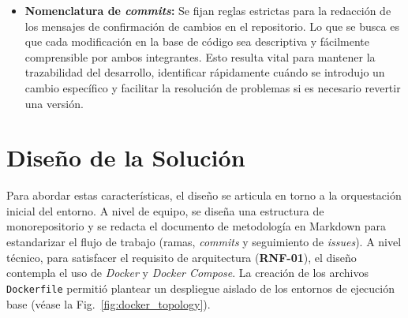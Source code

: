 \begin{itemize}
\begin{itemize}
        \item \textbf{Nomenclatura de \textit{commits}:} Se fijan reglas estrictas para la redacción de los mensajes de confirmación de cambios en el repositorio. Lo que se busca es que cada modificación en la base de código sea descriptiva y fácilmente comprensible por ambos integrantes. Esto resulta vital para mantener la trazabilidad del desarrollo, identificar rápidamente cuándo se introdujo un cambio específico y facilitar la resolución de problemas si es necesario revertir una versión.
    \end{itemize}
\end{itemize}

\section{Diseño de la Solución}
Para abordar estas características, el diseño se articula en torno a la orquestación inicial del entorno. A nivel de equipo, se diseña una estructura de monorepositorio y se redacta el documento de metodología en Markdown para estandarizar el flujo de trabajo (ramas, \textit{commits} y seguimiento de \textit{issues}). A nivel técnico, para satisfacer el requisito de arquitectura (\textbf{RNF-01}), el diseño contempla el uso de \textit{Docker} y \textit{Docker Compose}. La creación de los archivos \texttt{Dockerfile} permitió plantear un despliegue aislado de los entornos de ejecución base (véase la Fig.~\ref{fig:docker_topology}).

